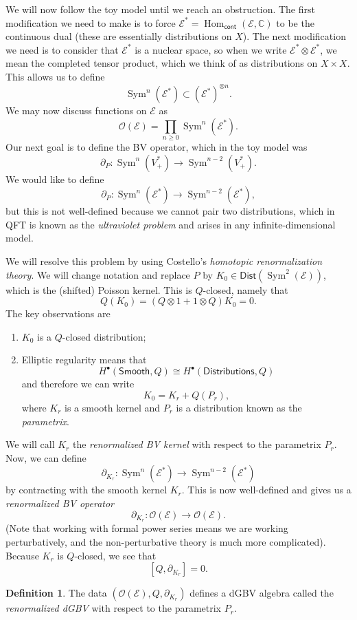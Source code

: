 \documentclass{amsart}
\theoremstyle{definition}
\newtheorem{defn}[thm]{Definition}
\theoremstyle{remark}
\theoremstyle{plain}
\theoremstyle{definition}
\theoremstyle{remark}
\newcommand{\C}{\mathbb{C}}
\newcommand{\mc}[1]{\mathcal{#1}}
\newcommand{\ms}[1]{\mathsf{#1}}
\newcommand{\1}{\mathbf{1}}
\newcommand{\2}{\mathbf{2}}
\newcommand{\3}{\mathbf{3}}
\DeclareMathOperator{\Hom}{Hom}
\DeclareMathOperator{\Sym}{Sym}
\begin{document}
We will now follow the toy model until we reach an obstruction. The first modification we need to make is to force \(\mc{E}^* = \Hom_{\ms{cont}}(\mc{E}, \C)\) to be the continuous dual (these are essentially distributions on \(X\)). The next modification we need is to consider that \(\mc{E}^*\) is a nuclear space, so when we write \(\mc{E}^* \otimes \mc{E}^*\), we mean the completed tensor product, which we think of as distributions on \(X \times X\). This allows us to define
\[ \Sym^n (\mc{E}^*) \subset (\mc{E}^*)^{\otimes n}. \]
We may now discuss functions on \(\mc{E}\) as
\[ \mc{O}(\mc{E}) = \prod_{n \geq 0} \Sym^n (\mc{E}^*). \]
Our next goal is to define the BV operator, which in the toy model was \[\partial_P \colon \Sym^n(V_+^*) \to \Sym^{n-2}(V_+^*).\] We would like to define
\[ \partial_P \colon \Sym^n(\mc{E}^*) \to \Sym^{n-2}(\mc{E}^*), \]
but this is not well-defined because we cannot pair two distributions, which in QFT is known as the \textit{ultraviolet problem} and arises in any infinite-dimensional model.

We will resolve this problem by using Costello's \textit{homotopic renormalization theory}. We will change notation and replace \(P\) by \(K_0 \in \ms{Dist}(\Sym^2(\mc{E}))\), which is the (shifted) Poisson kernel. This is \(Q\)-closed, namely that
\[ Q(K_0) = (Q \otimes 1 + 1 \otimes Q) K_0 = 0. \]
The key observations are
\begin{enumerate}
    \item \(K_0\) is a \(Q\)-closed distribution;
    \item Elliptic regularity means that
    \[ H^{\bullet}(\ms{Smooth}, Q) \cong H^{\bullet}(\ms{Distributions}, Q) \]
    and therefore we can write
    \[ K_0 = K_r + Q(P_r), \]
    where \(K_r\) is a smooth kernel and \(P_r\) is a distribution known as the \textit{parametrix}.
\end{enumerate}
We will call \(K_r\) the \textit{renormalized BV kernel} with respect to the parametrix \(P_r\). Now, we can define
\[ \partial_{K_r} \colon \Sym^n(\mc{E}^*) \to \Sym^{n-2}(\mc{E}^*) \]
by contracting with the smooth kernel \(K_r\). This is now well-defined and gives us a \textit{renormalized BV operator}
\[ \partial_{K_r} \colon \mc{O}(\mc{E}) \to \mc{O}(\mc{E}). \]
(Note that working with formal power series means we are working perturbatively, and the non-perturbative theory is much more complicated). Because \(K_r\) is \(Q\)-closed, we see that
\[ [Q, \partial_{K_r}] = 0. \]

\begin{defn}
    The data \((\mc{O}(\mc{E}), Q, \partial_{K_r})\) defines a dGBV algebra called the \textit{renormalized dGBV} with respect to the parametrix \(P_r\).
\end{defn}
\end{document}
